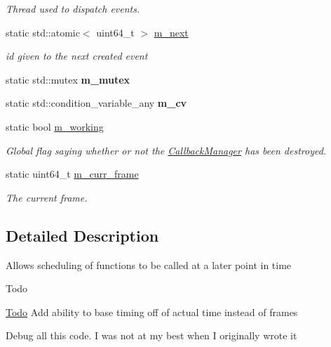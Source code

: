\begin{DoxyCompactItemize}
\begin{DoxyCompactList}\small\item\em Thread used to dispatch events. \end{DoxyCompactList}\item 
\mbox{\label{classnta_1_1CallbackManager_a714aa329a54538ec5bda528fa3a3ab7f}} 
static std\+::atomic$<$ uint64\+\_\+t $>$ \hyperlink{classnta_1_1CallbackManager_a714aa329a54538ec5bda528fa3a3ab7f}{m\+\_\+next}
\begin{DoxyCompactList}\small\item\em id given to the next created event \end{DoxyCompactList}\item 
\mbox{\label{classnta_1_1CallbackManager_a56903bee3075ab191f598e36438d6b50}} 
static std\+::mutex {\bfseries m\+\_\+mutex}
\item 
\mbox{\label{classnta_1_1CallbackManager_afa5d7642112c791dcfef35d78aff4d09}} 
static std\+::condition\+\_\+variable\+\_\+any {\bfseries m\+\_\+cv}
\item 
\mbox{\label{classnta_1_1CallbackManager_a20cd08f864fd62edbd68f5f309be5c30}} 
static bool \hyperlink{classnta_1_1CallbackManager_a20cd08f864fd62edbd68f5f309be5c30}{m\+\_\+working}
\begin{DoxyCompactList}\small\item\em Global flag saying whether or not the \hyperlink{classnta_1_1CallbackManager}{Callback\+Manager} has been destroyed. \end{DoxyCompactList}\item 
\mbox{\label{classnta_1_1CallbackManager_a69bbc2e4ac29aca06d09b2466b6769c2}} 
static uint64\+\_\+t \hyperlink{classnta_1_1CallbackManager_a69bbc2e4ac29aca06d09b2466b6769c2}{m\+\_\+curr\+\_\+frame}
\begin{DoxyCompactList}\small\item\em The current frame. \end{DoxyCompactList}\end{DoxyCompactItemize}


\subsection{Detailed Description}
Allows scheduling of functions to be called at a later point in time \begin{DoxyRefDesc}{Todo}
\item[\hyperlink{todo__todo000001}{Todo}]Add ability to base timing off of actual time instead of frames 

Debug all this code. I was not at my best when I originally wrote it \end{DoxyRefDesc}


